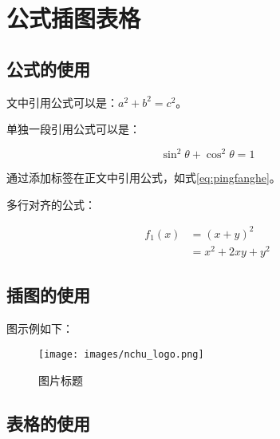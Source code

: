 %
%
%
%
%


\chapter{公式插图表格}

\section{公式的使用}

文中引用公式可以是：$a^2+b^2=c^2$。

单独一段引用公式可以是：

\begin{equation}
    \sin^2{\theta}+\cos^2{\theta}=1 \label{eq:pingfanghe}
\end{equation}

通过添加标签在正文中引用公式，如式\eqref{eq:pingfanghe}。

多行对齐的公式：

\begin{equation}
  \begin{aligned}
    f_1(x)&=(x+y)^2\\
          &=x^2+2xy+y^2
  \end{aligned}
\end{equation}

\section{插图的使用}

图示例如下：

\begin{figure}[htbp]
	\begin{center}
	    \vspace{13pt} %
		\texttt{[image: images/nchu\_logo.png]}
		\caption{图片标题} 
		\label{图片标题序号} %
	\end{center}
\end{figure}

\section{表格的使用}

